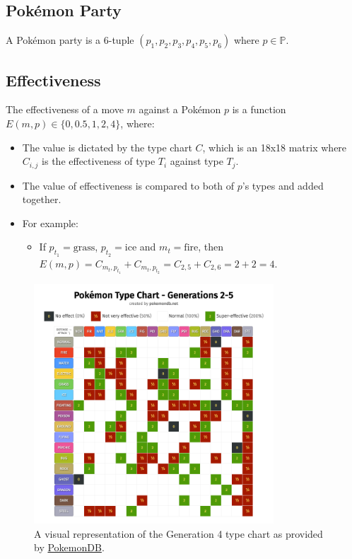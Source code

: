\subsection{Pokémon Party}

A Pokémon party is a 6-tuple $(p_1, p_2, p_3, p_4, p_5, p_6)$ where $p \in \mathbb{P}$.

\subsection{Effectiveness}

The effectiveness of a move $m$ against a Pokémon $p$ is a function $E(m, p) \in \{0, 0.5, 1, 2, 4\}$, where:
\begin{itemize}
    \item The value is dictated by the type chart $C$, which is an 18x18 matrix where $C_{i, j}$ is the effectiveness of type $T_i$ against type $T_j$.
    \item The value of effectiveness is compared to both of $p$'s types and added together.
    \item For example:
    \begin{itemize}
        \item If $p_{t_1} = \text{grass}$, $p_{t_2} = \text{ice}$ and $m_t = \text{fire}$, then $E(m, p) = C_{m_t, p_{t_1}} + C_{m_t, p_{t_2}} = C_{2, 5} + C_{2, 6} = 2 + 2 = 4$.
    \end{itemize}
\end{itemize}

\begin{figure}[h!]
    \centering
    \includegraphics[width=0.8\textwidth]{./imgs/typechart-gen2345.png}
    \caption{A visual representation of the Generation 4 type chart as provided by \href{https://pokemondb.net/type/old}{PokemonDB}.}
    \label{fig:typechart}
\end{figure}